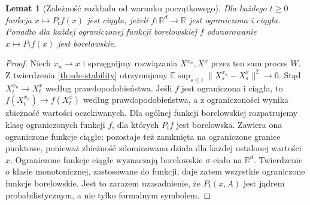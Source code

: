 \documentclass[11pt,a4paper,oneside]{report}
\numberwithin{equation}{chapter}
\theoremstyle{plain}
\newtheorem{lemat}[twierdzenie]{Lemat}
\theoremstyle{definition}
\theoremstyle{remark}
\newcommand{\R}{\mathbb{R}}
\newcommand{\E}{\mathbb{E}}
\newcommand{\norm}[1]{\lVert #1\rVert}
\begin{document}
\begin{lemat}[Zależność rozkładu od warunku początkowego]\label{lem:volIII:06:01}
\label{lem:sde-kernel}
Dla każdego $t\ge0$ funkcja $x\mapsto P_tf(x)$
jest ciągła, jeżeli $f:\R^d\to\R$ jest ograniczona
i ciągła. Ponadto dla każdej ograniczonej funkcji
borelowskiej $f$ odwzorowanie $x\mapsto P_tf(x)$
jest borelowskie.
\end{lemat}
\begin{proof}
Niech $x_n\to x$ i sprzęgnijmy rozwiązania
$X^{x_n},X^x$ przez ten sam proces $W$.
Z twierdzenia \ref{th:sde-stability} otrzymujemy
$\E\sup_{s\le t}\norm{X_s^{x_n}-X_s^x}^2\to0$.
Stąd $X_t^{x_n}\to X_t^x$ według prawdopodobieństwa.
Jeśli $f$ jest ograniczona i ciągła, to
$f(X_t^{x_n})\to f(X_t^x)$ według prawdopodobieństwa,
a z ograniczoności wynika zbieżność wartości oczekiwanych.
Dla ogólnej funkcji borelowskiej rozpatrujemy klasę
ograniczonych funkcji $f$, dla których $P_tf$ jest
borelowska. Zawiera ona ograniczone funkcje ciągłe;
pozostaje też zamknięta na ograniczone granice punktowe,
ponieważ zbieżność zdominowana działa dla każdej
ustalonej wartości $x$. Ograniczone funkcje ciągłe
wyznaczają borelowskie $\sigma$-ciało na $\R^d$.
Twierdzenie o klasie monotonicznej, zastosowane do
funkcji, daje zatem wszystkie ograniczone funkcje
borelowskie. Jest to zarazem uzasadnienie, że
$P_t(x,A)$ jest jądrem probabilistycznym, a nie
tylko formalnym symbolem.
\end{proof}
\end{document}
